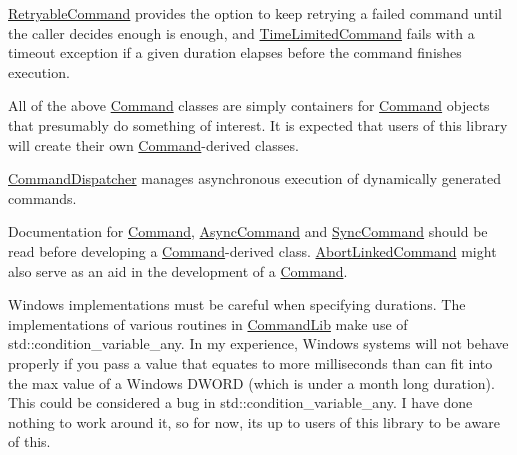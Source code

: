 \mbox{\hyperlink{class_command_lib_1_1_retryable_command}{Retryable\+Command}} provides the option to keep retrying a failed command until the caller decides enough is enough, and \mbox{\hyperlink{class_command_lib_1_1_time_limited_command}{Time\+Limited\+Command}} fails with a timeout exception if a given duration elapses before the command finishes execution. 

All of the above \mbox{\hyperlink{class_command_lib_1_1_command}{Command}} classes are simply containers for \mbox{\hyperlink{class_command_lib_1_1_command}{Command}} objects that presumably do something of interest. It is expected that users of this library will create their own \mbox{\hyperlink{class_command_lib_1_1_command}{Command}}-\/derived classes. 

\mbox{\hyperlink{class_command_lib_1_1_command_dispatcher}{Command\+Dispatcher}} manages asynchronous execution of dynamically generated commands. 

Documentation for \mbox{\hyperlink{class_command_lib_1_1_command}{Command}}, \mbox{\hyperlink{class_command_lib_1_1_async_command}{Async\+Command}} and \mbox{\hyperlink{class_command_lib_1_1_sync_command}{Sync\+Command}} should be read before developing a \mbox{\hyperlink{class_command_lib_1_1_command}{Command}}-\/derived class. \mbox{\hyperlink{class_command_lib_1_1_abort_linked_command}{Abort\+Linked\+Command}} might also serve as an aid in the development of a \mbox{\hyperlink{class_command_lib_1_1_command}{Command}}. 

Windows implementations must be careful when specifying durations. The implementations of various routines in \mbox{\hyperlink{namespace_command_lib}{Command\+Lib}} make use of std\+::condition\+\_\+variable\+\_\+any. In my experience, Windows systems will not behave properly if you pass a value that equates to more milliseconds than can fit into the max value of a Windows D\+W\+O\+RD (which is under a month long duration). This could be considered a bug in std\+::condition\+\_\+variable\+\_\+any. I have done nothing to work around it, so for now, it\textquotesingle{}s up to users of this library to be aware of this. 